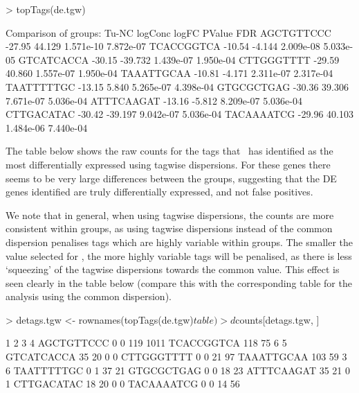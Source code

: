 \begin{Schunk}
\begin{Sinput}
> topTags(de.tgw)
\end{Sinput}
\begin{Soutput}
Comparison of groups: Tu-NC 
           logConc   logFC    PValue       FDR
AGCTGTTCCC  -27.95  44.129 1.571e-10 7.872e-07
TCACCGGTCA  -10.54  -4.144 2.009e-08 5.033e-05
GTCATCACCA  -30.15 -39.732 1.439e-07 1.950e-04
CTTGGGTTTT  -29.59  40.860 1.557e-07 1.950e-04
TAAATTGCAA  -10.81  -4.171 2.311e-07 2.317e-04
TAATTTTTGC  -13.15   5.840 5.265e-07 4.398e-04
GTGCGCTGAG  -30.36  39.306 7.671e-07 5.036e-04
ATTTCAAGAT  -13.16  -5.812 8.209e-07 5.036e-04
CTTGACATAC  -30.42 -39.197 9.042e-07 5.036e-04
TACAAAATCG  -29.96  40.103 1.484e-06 7.440e-04
\end{Soutput}
\end{Schunk}

The table below shows the raw counts for the tags that \edgeR~has
identified as the most differentially expressed using tagwise
dispersions. For these genes there seems to be very large differences
between the groups, suggesting that the DE genes identified are truly
differentially expressed, and not false positives.

We note that in general, when using tagwise dispersions, the counts
are more consistent within groups, as using tagwise dispersions
instead of the common dispersion penalises tags which are highly
variable within groups. The smaller the value selected for
, the more highly variable tags will be penalised, as
there is less `squeezing' of the tagwise dispersions towards the
common value. This effect is seen clearly in the table below (compare
this with the corresponding table for the analysis using the common dispersion).

\begin{Schunk}
\begin{Sinput}
> detags.tgw <- rownames(topTags(de.tgw)$table)
> d$counts[detags.tgw, ]
\end{Sinput}
\begin{Soutput}
             1  2   3    4
AGCTGTTCCC   0  0 119 1011
TCACCGGTCA 118 75   6    5
GTCATCACCA  35 20   0    0
CTTGGGTTTT   0  0  21   97
TAAATTGCAA 103 59   3    6
TAATTTTTGC   0  1  37   21
GTGCGCTGAG   0  0  18   23
ATTTCAAGAT  35 21   0    1
CTTGACATAC  18 20   0    0
TACAAAATCG   0  0  14   56
\end{Soutput}
\end{Schunk}

